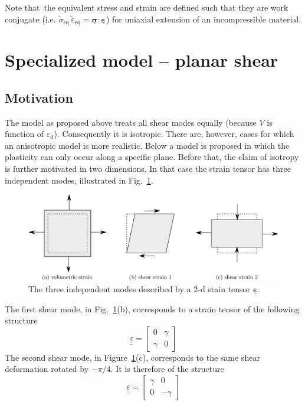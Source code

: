 \documentclass[times,namecite]{goose-article}
\newcommand\T[1]{\underline{\bm{{#1}}}}
\begin{document}
Note that\ the equivalent stress and strain are defined such that they are work conjugate (i.e. $\tilde{\sigma}_\mathrm{eq} \, \tilde{\varepsilon}_\mathrm{eq} = \T{\sigma} : \T{\varepsilon}$) for uniaxial extension of an incompressible material.

\section{Specialized model -- planar shear}

\subsection{Motivation}

The model as proposed above treats all shear modes equally (because $V$ is function of $\varepsilon_\mathrm{d}$). Consequently it is isotropic. There are, however, cases for which an anisotropic model is more realistic. Below a model is proposed in which the plasticity can only occur along a specific plane. Before that, the claim of isotropy is further motivated in two dimensions. In that case the strain tensor has three independent modes, illustrated in Fig.~\ref{fig:strain-modes:2d}.

\begin{figure}[htp]
  \centering
  \includegraphics[width=.7\textwidth]{figures/strain-modes_2d}
  \caption{The three independent modes described by a 2-d stain tensor $\T{\varepsilon}$.}
  \label{fig:strain-modes:2d}
\end{figure}

The first shear mode, in Fig.~\ref{fig:strain-modes:2d}(b), corresponds to a strain tensor of the following structure
\begin{equation} \label{eq:strain-modes:basic}
  \underline{\underline{\varepsilon}}
  =
  \begin{bmatrix}
    0      & \gamma \\
    \gamma &  0
  \end{bmatrix}
\end{equation}
The second shear mode, in Figure~\ref{fig:strain-modes:2d}(c), corresponds to the same shear deformation rotated by $-\pi/4$. It is therefore of the structure
\begin{equation}
  \underline{\underline{\varepsilon}}
  =
  \begin{bmatrix}
    \gamma &  0      \\
     0     & -\gamma
  \end{bmatrix}
\end{equation}
\end{document}
